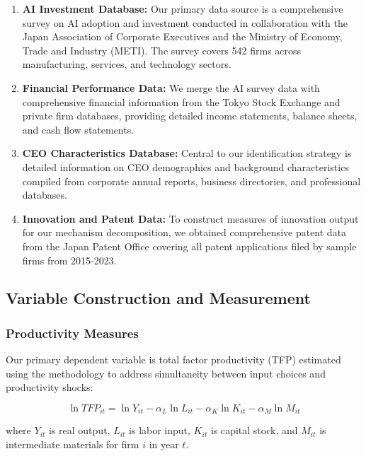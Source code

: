 \documentclass[12pt]{article}
\begin{document}
\begin{enumerate}
\item \textbf{AI Investment Database:} Our primary data source is a comprehensive survey on AI adoption and investment conducted in collaboration with the Japan Association of Corporate Executives and the Ministry of Economy, Trade and Industry (METI). The survey covers 542 firms across manufacturing, services, and technology sectors.

\item \textbf{Financial Performance Data:} We merge the AI survey data with comprehensive financial information from the Tokyo Stock Exchange and private firm databases, providing detailed income statements, balance sheets, and cash flow statements.

\item \textbf{CEO Characteristics Database:} Central to our identification strategy is detailed information on CEO demographics and background characteristics compiled from corporate annual reports, business directories, and professional databases.

\item \textbf{Innovation and Patent Data:} To construct measures of innovation output for our mechanism decomposition, we obtained comprehensive patent data from the Japan Patent Office covering all patent applications filed by sample firms from 2015-2023.
\end{enumerate}

\subsection{Variable Construction and Measurement}

\subsubsection{Productivity Measures}

Our primary dependent variable is total factor productivity (TFP) estimated using the \citet{olley1996dynamics} methodology to address simultaneity between input choices and productivity shocks:

\begin{equation}
\ln TFP_{it} = \ln Y_{it} - \alpha_L \ln L_{it} - \alpha_K \ln K_{it} - \alpha_M \ln M_{it}
\end{equation}

where $Y_{it}$ is real output, $L_{it}$ is labor input, $K_{it}$ is capital stock, and $M_{it}$ is intermediate materials for firm $i$ in year $t$.
\end{document}
